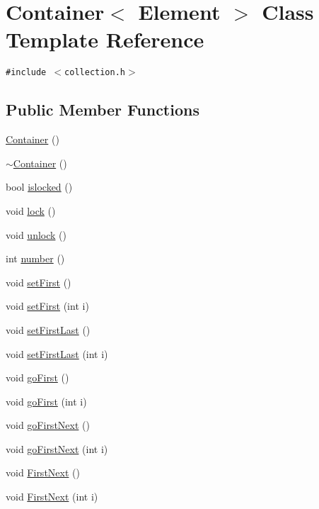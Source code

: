 \hypertarget{classContainer}{
\section{Container$<$ Element $>$ Class Template Reference}
\label{classContainer}
}
{\tt \#include $<$collection.h$>$}

\subsection*{Public Member Functions}
\begin{CompactItemize}
\item 
\hyperlink{classContainer_ac3acb1abebc929f273ef5bfad58663d}{Container} ()
\item 
\hyperlink{classContainer_378faacef1170f23344e63eedb3b6c10}{$\sim$Container} ()
\item 
bool \hyperlink{classContainer_9d4313e386763fec8caaf8c1c647c617}{islocked} ()
\item 
void \hyperlink{classContainer_b8bc8b72ecaf5121c8119b93c2781e5f}{lock} ()
\item 
void \hyperlink{classContainer_a3bae4d6afd5eddb5a5a4488c8c1f260}{unlock} ()
\item 
int \hyperlink{classContainer_fdfb23d60f7482b3790cd780959804cb}{number} ()
\item 
void \hyperlink{classContainer_86eea8a215d10d9470fbf607bda54620}{setFirst} ()
\item 
void \hyperlink{classContainer_2a5774d0210d839861134fa1089a78b4}{setFirst} (int i)
\item 
void \hyperlink{classContainer_a5153442b1a8eae3df4444d53460d5fc}{setFirstLast} ()
\item 
void \hyperlink{classContainer_5bd91f600ca1279a1f0081914c6f3f90}{setFirstLast} (int i)
\item 
void \hyperlink{classContainer_13215ed83f7c0d7efd24ae3af33a1ff3}{goFirst} ()
\item 
void \hyperlink{classContainer_015098542faf481295e1fb47ff56873b}{goFirst} (int i)
\item 
void \hyperlink{classContainer_63178fb6fc68357eceebbb98c6c3fd04}{goFirstNext} ()
\item 
void \hyperlink{classContainer_019351e1c671dd3459739f86fbc4f827}{goFirstNext} (int i)
\item 
void \hyperlink{classContainer_abce5e53a8d9493e4a363766e191653d}{FirstNext} ()
\item 
void \hyperlink{classContainer_b9e873be2839d0adc19fadd5210d4f53}{FirstNext} (int i)

\end{CompactItemize}
